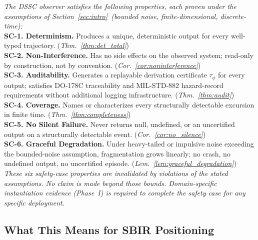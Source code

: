 \documentclass[11pt,a4paper]{article}
\theoremstyle{plain}
\theoremstyle{definition}
\theoremstyle{remark}
\begin{document}
\begin{center}
\begin{tcolorbox}[colback=blue!5, colframe=blue!50, boxrule=0.8pt, arc=3pt,
  left=7pt, right=7pt, top=6pt, bottom=6pt,
  title={\textbf{DSSC Safety-Case: Formal Operational Contract}},
  fonttitle=\normalsize\bfseries, coltitle=blue!10!black]
\textit{The DSSC observer satisfies the following properties, each proven under the
assumptions of Section~\ref{sec:intro}~(bounded noise, finite-dimensional, discrete-time):}
\\[0.5em]
\textbf{SC-1. Determinism.}
Produces a unique, deterministic output for every well-typed trajectory.
\hfill(\textit{Thm.~\ref{thm:det_total}})\\[0.25em]
\textbf{SC-2. Non-Interference.}
Has no side effects on the observed system; read-only by construction, not by convention.
\hfill(\textit{Cor.~\ref{cor:noninterference}})\\[0.25em]
\textbf{SC-3. Auditability.}
Generates a replayable derivation certificate $\tau_\phi$ for every output; satisfies
DO-178C traceability and MIL-STD-882 hazard-record requirements without additional
logging infrastructure.
\hfill(\textit{Thm.~\ref{thm:audit}})\\[0.25em]
\textbf{SC-4. Coverage.}
Names or characterizes every structurally detectable excursion in finite time.
\hfill(\textit{Thm.~\ref{thm:completeness}})\\[0.25em]
\textbf{SC-5. No Silent Failure.}
Never returns null, undefined, or an uncertified output on a structurally detectable event.
\hfill(\textit{Cor.~\ref{cor:no_silence}})\\[0.25em]
\textbf{SC-6. Graceful Degradation.}
Under heavy-tailed or impulsive noise exceeding the bounded-noise assumption, fragmentation
grows linearly; no crash, no undefined output, no uncertified episode.
\hfill(\textit{Lem.~\ref{lem:graceful_degradation}})\\[0.5em]
\textit{These six safety-case properties are invalidated by violations of the stated
assumptions. No claim is made beyond those bounds. Domain-specific instantiation
evidence (Phase~I) is required to complete the safety case for any specific deployment.}
\end{tcolorbox}
\end{center}

\subsection{What This Means for SBIR Positioning}
\end{document}
